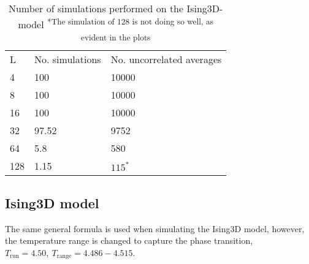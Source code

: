 \documentclass[a4paper]{article}
\newcommand{\trm}[1]{\textrm{#1}}
\begin{document}
\begin{table}[htpb]
\begin{center}
\begin{tabular}{l l l}
  L & No. simulations & No. uncorrelated averages\\
  4 & 100 & 10000\\
  8 & 100 & 10000\\
  16 & 100 & 10000\\
  32 & 97.52 & 9752 \\
  64 & 5.8 & 580 \\
  128 & 1.15  & $115^{*}$ \\
\end{tabular}
\end{center}
\caption{Number of simulations performed on the Ising3D-model  \textsuperscript{*The simulation of 128 is not doing so well, as evident in the plots}}
\end{table}
\subsection{Ising3D model}
The same general formula is used when simulating the Ising3D model, however, the temperature range is changed to capture the phase transition, $T_{\trm{run}} = 4.50, ~ T_{\trm{range}} = 4.486-4.515$.




\end{document}

